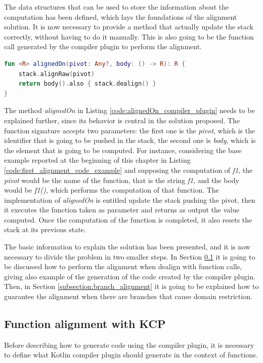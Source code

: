 The data structures that can be used to store the information about the computation has been defined, which lays the foundations of the alignment solution. It is now necessary to provide a method that actually update the stack correctly, without having to do it manually. This is also going to be the function call generated by the compiler plugin to perform the alignment.
\begin{lstlisting}[caption={Function that perfoms the alignment in the Kotlin compiler plugin solution}, captionpos=b, language=Kotlin, label={code:alignedOn_compiler_plugin}]
fun <R> alignedOn(pivot: Any?, body: () -> R): R {
    stack.alignRaw(pivot)
    return body().also { stack.dealign() }
}
\end{lstlisting}
The method \textit{alignedOn} in Listing \ref{code:alignedOn_compiler_plugin} needs to be explained further, since its behavior is central in the solution proposed.\newline
The function signature accepts two parameters: the first one is the \textit{pivot}, which is the identifier that is going to be pushed in the stack, the second one is \textit{body}, which is the element that is going to be computed.\newline
For instance, considering the base example reported at the beginning of this chapter in Listing \ref{code:first_alignment_code_example} and supposing the computation of \textit{f1}, the \textit{pivot} would be the name of the function, that is the string \textit{f1}, and the body would be \textit{f1()}, which performs the computation of that function.\newline
The implementation of \textit{alignedOn} is entitled update the stack pushing the pivot, then it executes the function taken as parameter and returns as output the value computed. Once the computation of the function is completed, it also resets the stack at its previous state.

The basic information to explain the solution has been presented, and it is now necessary to divide the problem in two smaller steps. In Section \ref{subsection:function_alignment} it is going to be discussed how to perform the alignment when dealign with function calls, giving also example of the generation of the code created by the compiler plugin. Then, in Section \ref{subsection:branch_alignment} it is going to be explained how to guarantee the alignment when there are branches that cause domain restriction.

\subsection{Function alignment with KCP}\label{subsection:function_alignment}
Before describing how to generate code using the compiler plugin, it is necessary to define what Kotlin compiler plugin should generate in the context of functions.

